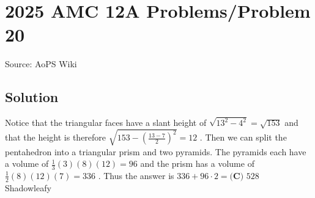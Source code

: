\documentclass[12pt]{article}
\begin{document}
\section*{{2025 AMC 12A Problems/Problem 20}}
Source: AoPS Wiki

\subsection*{Solution}
Notice that the triangular faces have a slant height of $\sqrt{13^2-4^2}=\sqrt{153}$ and that the height is therefore $\sqrt{153-(\frac{13-7}{2})^2} = 12$ . Then we can split the pentahedron into a triangular prism and two pyramids. The pyramids each have a volume of $\frac{1}{3}(3)(8)(12) = 96$ and the prism has a volume of $\frac{1}{2}(8)(12)(7) = 336$ . Thus the answer is $336+96 \cdot 2 = \boxed{\textbf{(C) } 528}$ ~ Shadowleafy
\end{document}
